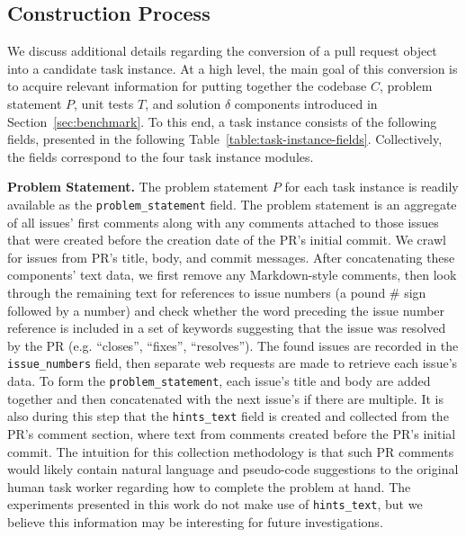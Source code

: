 \subsection{Construction Process}
\label{appx:benchmark:construction}
We discuss additional details regarding the conversion of a pull request object into a candidate task instance.
At a high level, the main goal of this conversion is to acquire relevant information for putting together the codebase $C$, problem statement $P$, unit tests $T$, and solution $\delta$ components introduced in Section~\ref{sec:benchmark}.
To this end, a \benchmark{} task instance consists of the following fields, presented in the following Table~\ref{table:task-instance-fields}.
Collectively, the fields correspond to the four task instance modules.



\textbf{Problem Statement.} The problem statement $P$ for each task instance is readily available as the \texttt{problem\_statement} field.
The problem statement is an aggregate of all issues' first comments along with any comments attached to those issues that were created before the creation date of the PR's initial commit.
We crawl for issues from PR's title, body, and commit messages. After concatenating these components' text data, we first remove any Markdown-style comments, then look through the remaining text for references to issue numbers (a pound \# sign followed by a number) and check whether the word preceding the issue number reference is included in a set of keywords suggesting that the issue was resolved by the PR (e.g. ``closes'', ``fixes'', ``resolves'').
The found issues are recorded in the \texttt{issue\_numbers} field, then separate web requests are made to retrieve each issue's data.
To form the \texttt{problem\_statement}, each issue's title and body are added together and then concatenated with the next issue's if there are multiple.
It is also during this step that the \texttt{hints\_text} field is created and collected from the PR's comment section, where text from comments created before the PR's initial commit.
The intuition for this collection methodology is that such PR comments would likely contain natural language and pseudo-code suggestions to the original human task worker regarding how to complete the problem at hand. 
The experiments presented in this work do not make use of \texttt{hints\_text}, but we believe this information may be interesting for future investigations.

